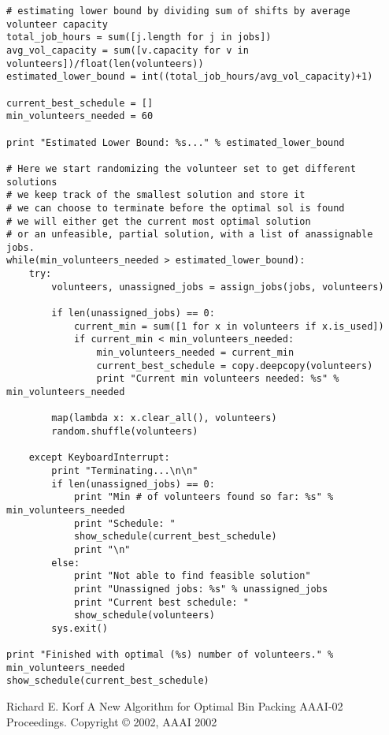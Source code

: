 \documentclass[12pt]{article}
\theoremstyle{definition}
\begin{document}
\begin{lstlisting}
# estimating lower bound by dividing sum of shifts by average volunteer capacity
total_job_hours = sum([j.length for j in jobs])
avg_vol_capacity = sum([v.capacity for v in volunteers])/float(len(volunteers))
estimated_lower_bound = int((total_job_hours/avg_vol_capacity)+1)

current_best_schedule = []
min_volunteers_needed = 60

print "Estimated Lower Bound: %s..." % estimated_lower_bound

# Here we start randomizing the volunteer set to get different solutions
# we keep track of the smallest solution and store it
# we can choose to terminate before the optimal sol is found
# we will either get the current most optimal solution
# or an unfeasible, partial solution, with a list of anassignable jobs.
while(min_volunteers_needed > estimated_lower_bound):
    try:
        volunteers, unassigned_jobs = assign_jobs(jobs, volunteers)

        if len(unassigned_jobs) == 0:
            current_min = sum([1 for x in volunteers if x.is_used])
            if current_min < min_volunteers_needed:
                min_volunteers_needed = current_min
                current_best_schedule = copy.deepcopy(volunteers)
                print "Current min volunteers needed: %s" % min_volunteers_needed

        map(lambda x: x.clear_all(), volunteers)
        random.shuffle(volunteers)

    except KeyboardInterrupt:
        print "Terminating...\n\n"
        if len(unassigned_jobs) == 0:
            print "Min # of volunteers found so far: %s" % min_volunteers_needed
            print "Schedule: "
            show_schedule(current_best_schedule)
            print "\n"
        else:
            print "Not able to find feasible solution"
            print "Unassigned jobs: %s" % unassigned_jobs
            print "Current best schedule: "
            show_schedule(volunteers)
        sys.exit()

print "Finished with optimal (%s) number of volunteers." % min_volunteers_needed
show_schedule(current_best_schedule)
\end{lstlisting}

\begin{thebibliography}{9}
	Richard E. Korf
	A New Algorithm for Optimal Bin Packing
	AAAI-02 Proceedings. Copyright © 2002, AAAI
	2002

\end{thebibliography}
\end{document}
